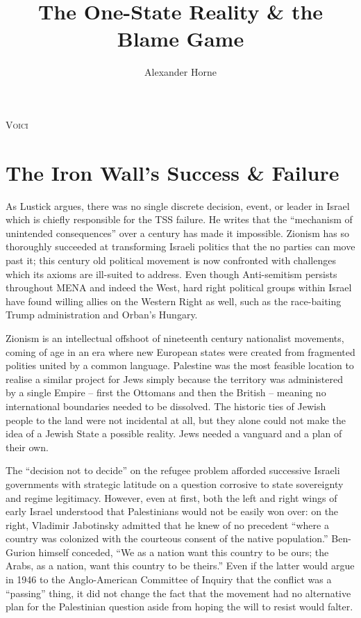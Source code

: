 \documentclass[letterpaper,12pt,twoside]{article} %
\title{\Huge The One-State Reality \& the Blame Game}
\author{\large Alexander Horne}
\date{} %
\begin{document}
\maketitle

\begin{adjustwidth}{1in}{1in}
    \lipsum[2]
\end{adjustwidth}

\begin{multicols}{2}

\lettrine[lraise=0.1, nindent=0em, slope=-.5em]{V}{oici} 

\section{The Iron Wall's Success \& Failure}

As Lustick argues, there was no single discrete decision, event, or leader in Israel which is chiefly responsible for the TSS failure. He writes that the ``mechanism of unintended consequences'' over a century has made it impossible.\autocite{lustick2019paradigm} Zionism has so thoroughly succeeded at transforming Israeli politics that the no parties can move past it; this century old political movement is now confronted with challenges which its axioms are ill-suited to address. Even though Anti-semitism persists throughout MENA and indeed the West, hard right political groups within Israel have found willing allies on the Western Right as well, such as the race-baiting Trump administration and Orban's Hungary. 

Zionism is an intellectual offshoot of nineteenth century nationalist movements, coming of age in an era where new European states were created from fragmented polities united by a common language. Palestine was the most feasible location to realise a similar project for Jews simply because the territory was administered by a single Empire -- first the Ottomans and then the British -- meaning no international boundaries needed to be dissolved. The historic ties of Jewish people to the land were not incidental at all, but they alone could not make the idea of a Jewish State a possible reality. Jews needed a vanguard and a plan of their own.

The ``decision not to decide'' on the refugee problem afforded successive Israeli governments with strategic latitude on a question corrosive to state sovereignty and regime legitimacy. However, even at first, both the left and right wings of early Israel understood that Palestinians would not be easily won over: on the right, Vladimir Jabotinsky admitted that he knew of no precedent ``where a country was colonized with the courteous consent of the native population.''\autocite[113]{caplan1978question} Ben-Gurion himself conceded, ``We as a nation want this country to be ours; the Arabs, as a nation, want this country to be theirs.''\autocite[80]{smith1988palestine} Even if the latter would argue in 1946 to the Anglo-American Committee of Inquiry that the conflict was a ``passing'' thing, it did not change the fact that the movement had no alternative plan for the Palestinian question aside from hoping the will to resist would falter. 


\end{multicols}
\end{document}
